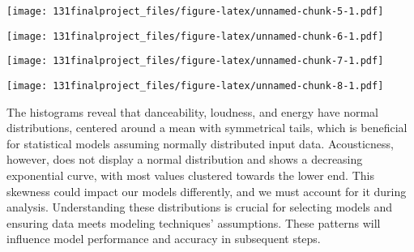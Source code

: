\documentclass[
]{article}
\newenvironment{Shaded}{\begin{snugshade}}{\end{snugshade}}
\newcommand{\AttributeTok}[1]{\textcolor[rgb]{0.13,0.29,0.53}{#1}}
\newcommand{\DecValTok}[1]{\textcolor[rgb]{0.00,0.00,0.81}{#1}}
\newcommand{\FunctionTok}[1]{\textcolor[rgb]{0.13,0.29,0.53}{\textbf{#1}}}
\newcommand{\NormalTok}[1]{#1}
\newcommand{\SpecialCharTok}[1]{\textcolor[rgb]{0.81,0.36,0.00}{\textbf{#1}}}
\newcommand{\StringTok}[1]{\textcolor[rgb]{0.31,0.60,0.02}{#1}}
\begin{document}
\texttt{[image: 131finalproject\_files/figure-latex/unnamed-chunk-5-1.pdf]}

\begin{Shaded}
\end{Shaded}

\texttt{[image: 131finalproject\_files/figure-latex/unnamed-chunk-6-1.pdf]}

\begin{Shaded}
\end{Shaded}

\texttt{[image: 131finalproject\_files/figure-latex/unnamed-chunk-7-1.pdf]}

\begin{Shaded}
\end{Shaded}

\texttt{[image: 131finalproject\_files/figure-latex/unnamed-chunk-8-1.pdf]}

The histograms reveal that danceability, loudness, and energy have
normal distributions, centered around a mean with symmetrical tails,
which is beneficial for statistical models assuming normally distributed
input data. Acousticness, however, does not display a normal
distribution and shows a decreasing exponential curve, with most values
clustered towards the lower end. This skewness could impact our models
differently, and we must account for it during analysis. Understanding
these distributions is crucial for selecting models and ensuring data
meets modeling techniques' assumptions. These patterns will influence
model performance and accuracy in subsequent steps.
\end{document}
